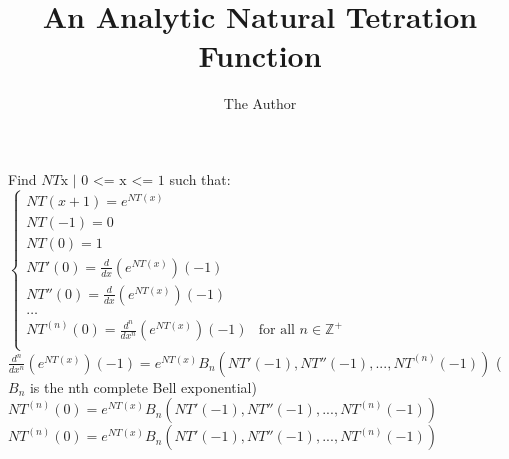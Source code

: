 \documentclass[11pt, oneside]{article}   	%
\title{An Analytic Natural Tetration Function}
\author{The Author}
\begin{document}
\maketitle

Find $NT \text{x | 0 <= x <= 1}$ such that:
$\begin{cases}
NT(x+1) = e^{NT(x)}\\
NT(-1) = 0\\
NT(0) = 1\\
NT'(0) = \frac{d}{dx}({e^{NT(x)}})(-1)\\
NT''(0) = \frac{d}{dx}({e^{NT(x)}})(-1)\\
\dots\\
NT^{(n)}(0) = \frac{d^n}{dx^n}({e^{NT(x)}})(-1)& \text{for all $n \in \mathbb{Z}^+$}\\
\end{cases}$\\

$\frac{d^n}{dx^n}({e^{NT(x)}})(-1) = e^{NT(x)}B_n(NT'(-1),NT''(-1),...,NT^{(n)}(-1))$ ($B_n$ is the nth complete Bell exponential)\\
$NT^{(n)}(0) = e^{NT(x)}B_n(NT'(-1),NT''(-1),...,NT^{(n)}(-1))$
$NT^{(n)}(0) = e^{NT(x)}B_n(NT'(-1),NT''(-1),...,NT^{(n)}(-1))$
\end{document}
